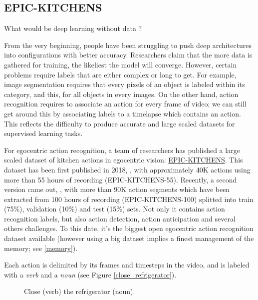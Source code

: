 \documentclass[12pt, a4paper]{report}
\begin{document}
			\subsection{EPIC-KITCHENS}
				What would be deep learning without data ?
				\par
				From the very beginning, people have been struggling to push deep architectures into configurations with better accuracy.
				Researchers claim that the more data is gathered for training, the likeliest the model will converge.
				However, certain problems require labels that are either complex or long to get.
				For example, image segmentation requires that every pixels of an object is labeled within its category, and this, for all objects in every images.
				On the other hand, action recognition requires to associate an action for every frame of video; we can still get around this by associating labels to a timelapse which contains an action.
				This reflects the difficulty to produce accurate and large scaled datasets for supervised learning tasks.
				\par
				For egocentric action recognition, a team of researchers has published a large scaled dataset of kitchen actions in egocentric vision: \href{https://epic-kitchens.github.io/2021}{EPIC-KITCHENS}.
				This dataset has been first published in 2018, \cite{damen2018scaling}, with approximately 40K actions using more than 55 hours of recording (EPIC-KITCHENS-55).
				Recently, a second version came out, \cite{damen2020rescaling}, with more than 90K action segments which have been extracted from 100 hours of recording (EPIC-KITCHENS-100) splitted into train (75\%), validation (10\%) and test (15\%) sets.
				Not only it contains action recognition labels, but also action detection, action anticipation and several others challenges.
				To this date, it's the biggest open egocentric action recognition dataset available (however using a big dataset implies a finest management of the memory; see \ref{memory}).
				\par
				Each action is delimited by its frames and timesteps in the video, and is labeled with a {\itshape verb} and a {\itshape noun} (see Figure \ref{close_refrigerator}).
				\begin{figure}[h!]
					\centering
					\caption{Close ({\small verb}) the refrigerator ({\small noun}).}
				\end{figure}
\end{document}
